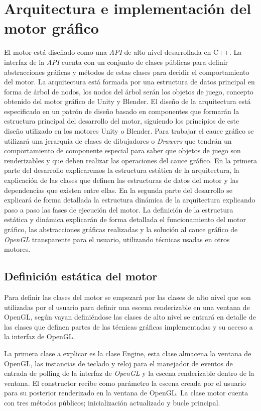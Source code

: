 \documentclass[a4paper]{book}
\begin{document}
\cleardoublepage
\chapter{Arquitectura e implementación del motor gráfico}

El motor está diseñado como una \textit{API} de alto nivel desarrollada en C++. La interfaz de la \textit{API} cuenta con un conjunto
de clases públicas para definir abstracciones gráficas y métodos de estas clases para decidir el comportamiento del motor. La arquitectura
está formada por una estructura de datos principal en forma de árbol de nodos, los nodos del árbol serán los objetos de juego, concepto obtenido
del motor gráfico de Unity y Blender. El diseño de la arquitectura está especificado en un patrón de diseño basado en componentes que formarán
la estructura principal del desarrollo del motor, siguiendo los principios de este diseño utilizado en los motores Unity o Blender. Para
trabajar el cauce gráfico se utilizará una jerarquía de clases de dibujadores o \textit{Drawers} que tendrán un comportamiento de componente
especial para saber que objetos de juego son renderizables y que deben realizar las operaciones del cauce gráfico. En la primera parte del
desarrollo explicaremos la estructura estática de la arquitectura, la explicación de las clases que definen las estructuras de datos del
motor y las dependencias que existen entre ellas. En la segunda parte del desarrollo se explicará de forma detallada la estructura dinámica
de la arquitectura explicando paso a paso las fases de ejecución del motor. La definición de la estructura estática y dinámica explicarán
de forma detallada el funcionamiento del motor gráfico, las abstracciones gráficas realizadas y la solución al cauce gráfico de
\textit{OpenGL} transparente para el usuario, utilizando técnicas usadas en otros motores.

\section{Definición estática del motor}
\label{sec:estatica}

Para definir las clases del motor se empezará por las clases de alto nivel que son utilizadas por el usuario para definir una
escena renderizable en una ventana de OpenGL, según vayan definiéndose las clases de alto nivel se entrará en detalle de las
clases que definen partes de las técnicas gráficas implementadas y su acceso a la interfaz de OpenGL.

La primera clase a explicar es la clase Engine, esta clase almacena la ventana de OpenGL, las instancias de teclado y reloj
para el manejador de eventos de entrada de polling de la interfaz de \textit{OpenGL} y la escena renderizable dentro de la ventana.
El constructor recibe como parámetro la escena creada por el usuario para su posterior renderizado en la ventana de OpenGL.
La clase motor cuenta con tres métodos públicos; inicialización actualizado y bucle principal.
\end{document}

